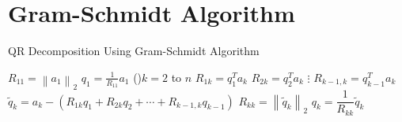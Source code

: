 \section{Gram-Schmidt Algorithm}

\begin{algorithm}[htbp]
    \caption{QR Decomposition Using Gram-Schmidt Algorithm}

    $R_{11}=\left\|a_{1}\right\|_{2}$ \;
     $q_{1}=\frac{1}{R_{11}} a_{1}$ \;
\For(){$k=2$ to $n$}{
$R_{1 k} =q_{1}^{T} a_{k}$ \;
$R_{2 k} =q_{2}^{T} a_{k} $\;
 $\vdots$ \;
$R_{k-1, k} =q_{k-1}^{T} a_{k}$ \;
$\tilde{q}_{k} =a_{k}-\left(R_{1 k} q_{1}+R_{2 k} q_{2}+\cdots+R_{k-1, k} q_{k-1}\right)$ \;
$R_{k k} =\left\|\tilde{q}_{k}\right\|_{2}$ \;
 $q_{k} =\dfrac{1}{R_{k k}} \tilde{q}_{k}$ \;
}
\end{algorithm}


